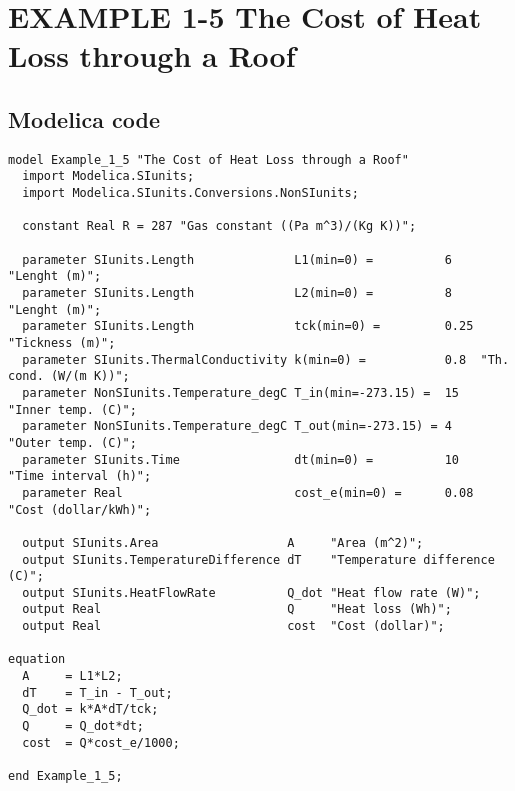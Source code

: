 \documentclass{modelica}
\begin{document}
\thispagestyle{empty}
\date{} %

\section*{EXAMPLE 1-5 The Cost of Heat Loss through a Roof}

\subsection*{Modelica code}


\begin{lstlisting}[mathescape=true] 
model Example_1_5 "The Cost of Heat Loss through a Roof"
  import Modelica.SIunits;
  import Modelica.SIunits.Conversions.NonSIunits;

  constant Real R = 287 "Gas constant ((Pa m^3)/(Kg K))";

  parameter SIunits.Length              L1(min=0) =          6    "Lenght (m)";
  parameter SIunits.Length              L2(min=0) =          8    "Lenght (m)";
  parameter SIunits.Length              tck(min=0) =         0.25 "Tickness (m)";
  parameter SIunits.ThermalConductivity k(min=0) =           0.8  "Th. cond. (W/(m K))";
  parameter NonSIunits.Temperature_degC T_in(min=-273.15) =  15   "Inner temp. (C)";
  parameter NonSIunits.Temperature_degC T_out(min=-273.15) = 4    "Outer temp. (C)";
  parameter SIunits.Time                dt(min=0) =          10   "Time interval (h)";
  parameter Real                        cost_e(min=0) =      0.08  "Cost (dollar/kWh)";

  output SIunits.Area                  A     "Area (m^2)";
  output SIunits.TemperatureDifference dT    "Temperature difference (C)";
  output SIunits.HeatFlowRate          Q_dot "Heat flow rate (W)";
  output Real                          Q     "Heat loss (Wh)";
  output Real                          cost  "Cost (dollar)";

equation 
  A     = L1*L2;
  dT    = T_in - T_out;
  Q_dot = k*A*dT/tck;
  Q     = Q_dot*dt;
  cost  = Q*cost_e/1000;
  
end Example_1_5;  
\end{lstlisting}
\end{document}
